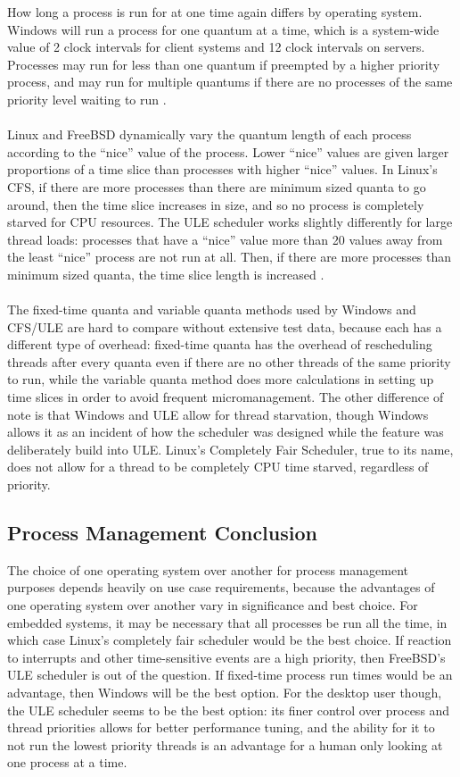 \documentclass[10pt,draftclsnofoot,onecolumn]{article}
\begin{document}
How long a process is run for at one time again differs by operating system. Windows will run a process for one quantum at a time, which is a system-wide value of 2 clock intervals for client systems and 12 clock intervals on servers. Processes may run for less than one quantum if preempted by a higher priority process, and may run for multiple quantums if there are no processes of the same priority level waiting to run \cite{Wandos}.
\\\\
Linux and FreeBSD dynamically vary the quantum length of each process according to the “nice” value of the process. Lower “nice” values are given larger proportions of a time slice than processes with higher “nice” values. In Linux’s CFS, if there are more processes than there are minimum sized quanta to go around, then the time slice increases in size, and so no process is completely starved for CPU resources. The ULE scheduler works slightly differently for large thread loads: processes that have a “nice” value more than 20 values away from the least “nice” process are not run at all. Then, if there are more processes than minimum sized quanta, the time slice length is increased \cite{Love:2005:LKD:1214858, Roberson03ule:a}.
\\\\
The fixed-time quanta and variable quanta methods used by Windows and CFS/ULE are hard to compare without extensive test data, because each has a different type of overhead: fixed-time quanta has the overhead of rescheduling threads after every quanta even if there are no other threads of the same priority to run, while the variable quanta method does more calculations in setting up time slices in order to avoid frequent micromanagement. The other difference of note is that Windows and ULE allow for thread starvation, though Windows allows it as an incident of how the scheduler was designed while the feature was deliberately build into ULE. Linux’s Completely Fair Scheduler, true to its name, does not allow for a thread to be completely CPU time starved, regardless of priority. 

\subsection{Process Management Conclusion}

The choice of one operating system over another for process management purposes depends heavily on use case requirements, because the advantages of one operating system over another vary in significance and best choice. For embedded systems, it may be necessary that all processes be run all the time, in which case Linux’s completely fair scheduler would be the best choice. If reaction to interrupts and other time-sensitive events are a high priority, then FreeBSD’s ULE scheduler is out of the question. If fixed-time process run times would be an advantage, then Windows will be the best option. For the desktop user though, the ULE scheduler seems to be the best option: its finer control over process and thread priorities allows for better performance tuning, and the ability for it to not run the lowest priority threads is an advantage for a human only looking at one process at a time.
\end{document}
